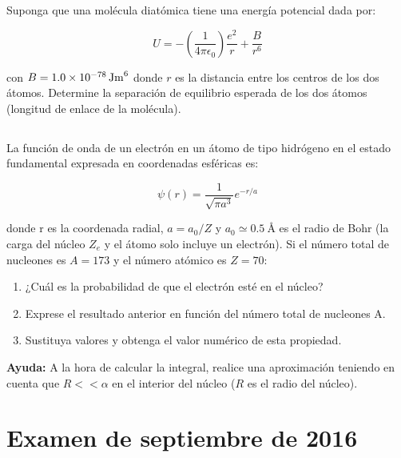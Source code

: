 \documentclass[12pt]{article}
\begin{document}
    \subsection{}
    Suponga que una molécula diatómica tiene una energía potencial dada por:

    $$U=-\left(\frac{1}{4\pi\epsilon_0}\right)\frac{e^2}{r}+\frac{B}{r^6}$$

    con $B=\SI{1.0d-78}{\J\meter^6}$ donde $r$ es la distancia entre los centros de los dos átomos.
    Determine la separación de equilibrio esperada de los dos átomos (longitud de enlace de la molécula).



    \subsection{}
    La función de onda de un electrón en un átomo de tipo hidrógeno en el estado fundamental
    expresada en coordenadas esféricas es:

    $$\psi(r)=\frac{1}{\sqrt{\pi a^3}}e^{-r/a}$$

    donde r es la coordenada radial, $a=a_0/Z$ y $a_0\simeq\SI{0.5}{\angstrom}$ es el radio de Bohr
    (la carga del núcleo $Z_e$ y el átomo solo incluye un electrón). Si el número total de
    nucleones es $A=173$ y el número atómico es $Z=70$:
    \begin{enumerate}[label=\alph*)]
        \item ¿Cuál es la probabilidad de que el electrón esté en el núcleo?
        \item Exprese el resultado anterior en función del número total de nucleones A.
        \item Sustituya valores y obtenga el valor numérico de esta propiedad.
    \end{enumerate}
    \textbf{Ayuda:} A la hora de calcular la integral, realice una aproximación teniendo en cuenta
    que $R<<\alpha$ en el interior del núcleo ($R$ es el radio del núcleo).


    \section*{Examen de septiembre de 2016}
    \setcounter{subsection}{0}
\end{document}
